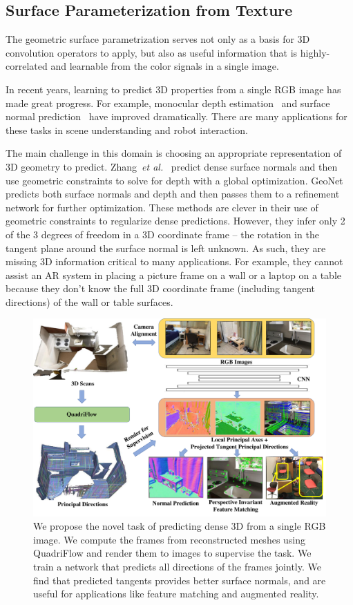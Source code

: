\subsection{Surface Parameterization from Texture}
\label{intro:frame}
The geometric surface parametrization serves not only as a basis for 3D convolution operators to apply, but also as useful information that is highly-correlated and learnable from the color signals in a single image.

In recent years, learning to predict 3D properties from a single RGB image has made great progress.  For example, monocular depth estimation~\cite{shelhamer2015scene,li2017two,xu2017multi,wang2018adaptive,fu2018deep} and surface normal prediction~\cite{eigen2015predicting,wang2015designing,bansal2016marr,qi2018geonet} have improved dramatically.  There are many applications for these tasks in scene understanding and robot interaction.

The main challenge in this domain is choosing an appropriate representation of 3D geometry to predict.  Zhang~\textit{et al.}~\cite{zhang2018deep} predict dense surface normals and then use geometric constraints to solve for depth with a global optimization.  GeoNet~\cite{qi2018geonet} predicts both surface normals and depth and then passes them to a refinement network for further optimization.  These methods are clever in their use of geometric constraints to regularize dense predictions.   However, they infer only 2 of the 3 degrees of freedom in a 3D coordinate frame -- the rotation in the tangent plane around the surface normal is left unknown.  As such, they are missing 3D information critical to many applications.   For example, they cannot assist an AR system in placing a picture frame on a wall or a laptop on a table because they don't know the full 3D coordinate frame (including tangent directions) of the wall or table surfaces.

 \begin{figure}
    \centering
    \includegraphics[width=0.75\linewidth]{FrameNet/graph/teaser.pdf}
    \caption{We propose the novel task of predicting dense 3D \cframe{} from a single RGB image. We compute the frames from reconstructed meshes using QuadriFlow and render them to images to supervise the task.  We train a network that predicts all directions of the frames jointly.  We find that predicted tangents provides better surface normals, and are useful for applications like feature matching and augmented reality.}
    \label{fig:framenet-teaser}
    \vspace{-0.1in}
\end{figure}



